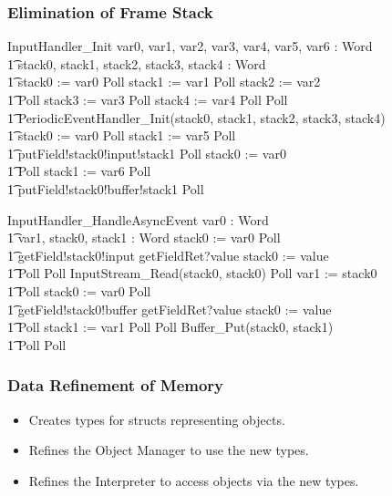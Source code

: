 \documentclass{beamer}
\begin{document}
\begin{frame}[shrink]
  \frametitle{Elimination of Frame Stack}
  \setlength{\zedleftsep}{0cm}
  \setlength{\zedindent}{0cm}
  \begin{circus}
    InputHandler\_Init \circdef \circval var0, var1, var2, var3, var4, var5, var6 : Word  \circspot \\
    \t1 \circvar stack0, stack1, stack2, stack3, stack4 : Word \circspot \\
    \t1 stack0 := var0 \circseq Poll \circseq stack1 := var1 \circseq Poll \circseq stack2 := var2 \circseq \\
    \t1 Poll \circseq stack3 := var3 \circseq Poll \circseq stack4 := var4 \circseq Poll \circseq Poll \\
    \t1 PeriodicEventHandler\_Init(stack0, stack1, stack2, stack3, stack4) \circseq \\
    \t1 stack0 := var0 \circseq Poll \circseq stack1 := var5 \circseq Poll \circseq \\
    \t1 putField!stack0!input!stack1 \then \Skip \circseq Poll \circseq stack0 := var0 \circseq \\
    \t1 Poll \circseq stack1 := var6 \circseq Poll \circseq \\
    \t1 putField!stack0!buffer!stack1 \then \Skip \circseq Poll
  \end{circus}
  \begin{circus}
    InputHandler\_HandleAsyncEvent \circdef \circval var0 : Word \circspot \\
    \t1 \circvar var1, stack0, stack1 : Word \circspot stack0 := var0 \circseq Poll \circseq \\
    \t1 getField!stack0!input \then getFieldRet?value \then stack0 := value \circseq \\
    \t1 Poll \circseq Poll \circseq InputStream\_Read(stack0, stack0) \circseq Poll \circseq var1 := stack0 \circseq \\
    \t1 Poll \circseq stack0 := var0 \circseq Poll \circseq \\
    \t1 getField!stack0!buffer \then getFieldRet?value \then stack0 := value \circseq \\
    \t1 Poll \circseq stack1 := var1 \circseq Poll \circseq Poll \circseq Buffer\_Put(stack0, stack1) \circseq \\
    \t1 Poll \circseq Poll
  \end{circus}
\end{frame}

\begin{frame}
  \frametitle{Data Refinement of Memory}
  \begin{itemize}
  \item Creates types for structs representing objects.
  \item Refines the Object Manager to use the new types.
  \item Refines the Interpreter to access objects via the new types.
  \end{itemize}
\end{frame}
\end{document}
